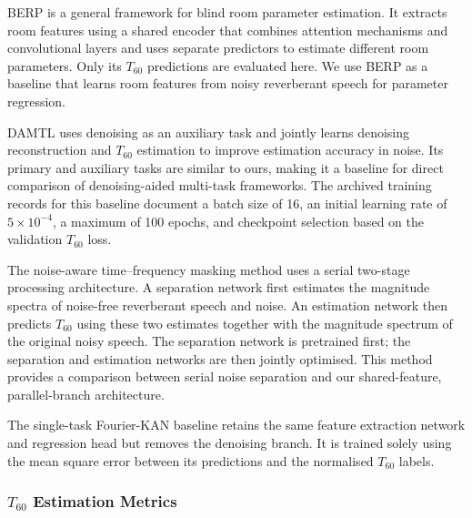 \documentclass[a4paper,fleqn]{cas-sc}
\begin{document}


BERP \citep{wang2025berp} is a general framework for blind room parameter estimation. It extracts room features using a shared encoder that combines attention mechanisms and convolutional layers and uses separate predictors to estimate different room parameters. Only its $T_{60}$ predictions are evaluated here. We use BERP as a baseline that learns room features from noisy reverberant speech for parameter regression.



DAMTL \citep{zhang2024damtl} uses denoising as an auxiliary task and jointly learns denoising reconstruction and $T_{60}$ estimation to improve estimation accuracy in noise. Its primary and auxiliary tasks are similar to ours, making it a baseline for direct comparison of denoising-aided multi-task frameworks. The archived training records for this baseline document a batch size of 16, an initial learning rate of $5\times10^{-4}$, a maximum of 100 epochs, and checkpoint selection based on the validation $T_{60}$ loss.



The noise-aware time--frequency masking method \citep{zheng2022noiseaware} uses a serial two-stage processing architecture. A separation network first estimates the magnitude spectra of noise-free reverberant speech and noise. An estimation network then predicts $T_{60}$ using these two estimates together with the magnitude spectrum of the original noisy speech. The separation network is pretrained first; the separation and estimation networks are then jointly optimised. This method provides a comparison between serial noise separation and our shared-feature, parallel-branch architecture.



The single-task Fourier-KAN baseline retains the same feature extraction network and regression head but removes the denoising branch. It is trained solely using the mean square error between its predictions and the normalised $T_{60}$ labels.



\subsubsection{$T_{60}$ Estimation Metrics}
\label{sec:t60_metrics}
\end{document}
